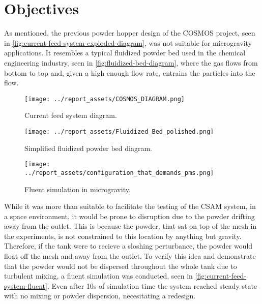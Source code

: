 \section{Objectives}
As mentioned, the previous powder hopper design of the COSMOS project, seen in \autoref{fig:current-feed-system-exploded-diagram}, was not suitable for microgravity applications. It resembles a typical fluidized powder bed used in the chemical engineering industry, seen in \autoref{fig:fluidized-bed-diagram}, where the gas flows from bottom to top and, given a high enough flow rate, entrains the particles into the flow.
\begin{figure}[htbp]
    \centering

    \begin{minipage}{0.3\textwidth}
        \centering
        \texttt{[image: ../report\_assets/COSMOS\_DIAGRAM.png]}
        \caption{Current feed system diagram.}\label{fig:current-feed-system-exploded-diagram}
    \end{minipage}
    \hfill
    \begin{minipage}{0.3\textwidth}
        \centering
        \texttt{[image: ../report\_assets/Fluidized\_Bed\_polished.png]}
        \caption{Simplified fluidized powder bed diagram.}\label{fig:fluidized-bed-diagram}
    \end{minipage}
    \hfill
    \begin{minipage}{0.3\textwidth}
        \centering
        \texttt{[image: ../report\_assets/configuration\_that\_demands\_pms.png]}
        \caption{Fluent simulation in microgravity.}\label{fig:current-feed-system-fluent}
    \end{minipage}

\end{figure}

While it was more than suitable to facilitate the testing of the CSAM system, in a space environment, it would be prone to disruption due to the powder drifting away from the outlet. This is because the powder, that sat on top of the mesh in the experiments, is not constrained to this location by anything but gravity. Therefore, if the tank were to recieve a sloshing perturbance, the powder would float off the mesh and away from the outlet. To verify this idea and demonstrate that the powder would not be dispersed throughout the whole tank due to turbulent mixing, a fluent simulation was conducted, seen in \autoref{fig:current-feed-system-fluent}. Even after 10s of simulation time the system reached steady state with no mixing or powder dispersion, necesitating a redesign.


